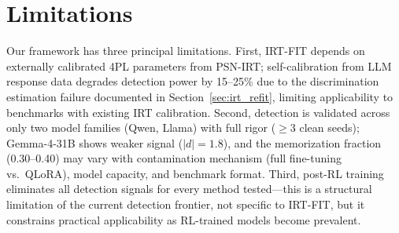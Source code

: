 \documentclass[11pt,a4paper]{article}
\begin{document}
\section*{Limitations}

Our framework has three principal limitations. First, IRT-FIT depends on externally calibrated 4PL parameters from PSN-IRT; self-calibration from LLM response data degrades detection power by 15--25\% due to the discrimination estimation failure documented in Section~\ref{sec:irt_refit}, limiting applicability to benchmarks with existing IRT calibration. Second, detection is validated across only two model families (Qwen, Llama) with full rigor ($\geq$3 clean seeds); Gemma-4-31B shows weaker signal ($|d| = 1.8$), and the memorization fraction (0.30--0.40) may vary with contamination mechanism (full fine-tuning vs.\ QLoRA), model capacity, and benchmark format. Third, post-RL training eliminates all detection signals for every method tested---this is a structural limitation of the current detection frontier, not specific to IRT-FIT, but it constrains practical applicability as RL-trained models become prevalent.
\end{document}
